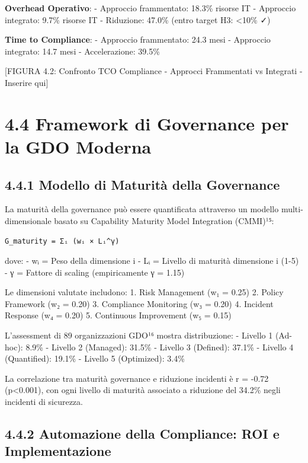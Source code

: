 \documentclass[12pt,a4paper,oneside]{book}
\numberwithin{figure}{chapter} %
\numberwithin{table}{chapter}  %
\begin{document}
\textbf{Overhead Operativo}: - Approccio frammentato: 18.3\% risorse IT
- Approccio integrato: 9.7\% risorse IT - Riduzione: 47.0\% (entro
target H3: \textless10\% ✓)

\textbf{Time to Compliance}: - Approccio frammentato: 24.3 mesi -
Approccio integrato: 14.7 mesi - Accelerazione: 39.5\%

{[}FIGURA 4.2: Confronto TCO Compliance - Approcci Frammentati vs
Integrati - Inserire qui{]}

\section{4.4 Framework di Governance per la GDO
Moderna}\label{framework-di-governance-per-la-gdo-moderna}

\subsection{4.4.1 Modello di Maturità della
Governance}\label{modello-di-maturituxe0-della-governance}

La maturità della governance può essere quantificata attraverso un
modello multi-dimensionale basato su Capability Maturity Model
Integration (CMMI)¹⁵:

\begin{verbatim}
G_maturity = Σᵢ (wᵢ × Lᵢ^γ)
\end{verbatim}

dove: - wᵢ = Peso della dimensione i - Lᵢ = Livello di maturità
dimensione i (1-5) - γ = Fattore di scaling (empiricamente γ = 1.15)

Le dimensioni valutate includono: 1. Risk Management (w₁ = 0.25) 2.
Policy Framework (w₂ = 0.20) 3. Compliance Monitoring (w₃ = 0.20) 4.
Incident Response (w₄ = 0.20) 5. Continuous Improvement (w₅ = 0.15)

L'assessment di 89 organizzazioni GDO¹⁶ mostra distribuzione: - Livello
1 (Ad-hoc): 8.9\% - Livello 2 (Managed): 31.5\% - Livello 3 (Defined):
37.1\% - Livello 4 (Quantified): 19.1\% - Livello 5 (Optimized): 3.4\%

La correlazione tra maturità governance e riduzione incidenti è r =
-0.72 (p\textless0.001), con ogni livello di maturità associato a
riduzione del 34.2\% negli incidenti di sicurezza.

\subsection{4.4.2 Automazione della Compliance: ROI e
Implementazione}\label{automazione-della-compliance-roi-e-implementazione}
\end{document}
